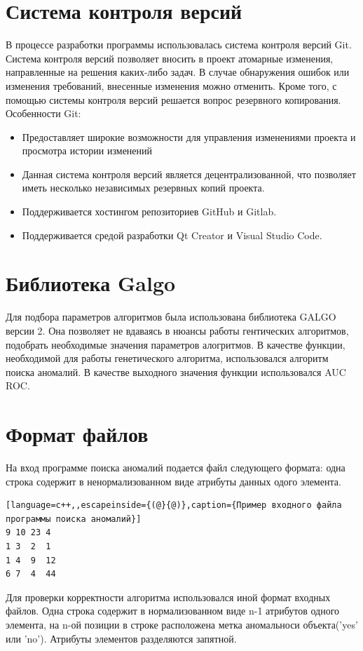 \section{Система контроля версий}
В процессе разработки программы использовалась система контроля
версий Git.
Система контроля версий позволяет вносить в проект атомарные
изменения, направленные на решения каких-либо задач. В случае
обнаружения ошибок или изменения требований, внесенные изменения
можно отменить.
Кроме того, с помощью системы контроля версий решается вопрос
резервного копирования.
Особенности Git:
\begin{itemize}
\item Предоставляет широкие возможности для управления изменениями
	проекта и просмотра истории изменений
 \item Данная система контроля версий является децентрализованной, что
позволяет иметь несколько независимых резервных копий проекта.
\item Поддерживается хостингом репозиториев GitHub и Gitlab.
\item Поддерживается средой разработки Qt Creator и Visual Studio Code.
\end{itemize}
\section{Библиотека Galgo}
Для подбора параметров алгоритмов была использована библиотека GALGO версии 2. Она позволяет не вдаваясь в нюансы работы гентических алгоритмов, подобрать необходимые значения параметров алогритмов. В качестве функции, необходимой для работы генетического алгоритма, использовался алгоритм поиска аномалий. В качестве выходного значения функции использовался AUC ROC.
\section{Формат файлов}
На вход программе поиска аномалий подается файл следующего формата: одна строка содержит  в ненормализованном виде  атрибуты данных одого элемента.
\begin{lstlisting}[language=c++,,escapeinside={(@}{@)},caption={Пример входного файла программы поиска аномалий}] 
9 10 23 4
1 3  2  1
1 4  9  12
6 7  4  44
\end{lstlisting}
Для проверки корректности алгоритма использовался иной формат входных файлов. Одна строка содержит в нормализованном виде n-1 атрибутов одного элемента, на n-ой позиции в строке расположена метка аномальноси объекта('yes' или 'no'). Атрибуты элементов разделяются запятной.


